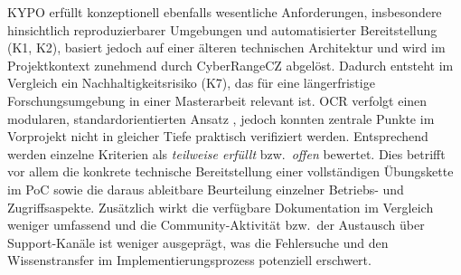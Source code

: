 KYPO erfüllt konzeptionell ebenfalls wesentliche Anforderungen, insbesondere hinsichtlich reproduzierbarer Umgebungen und automatisierter Bereitstellung (K1, K2), basiert jedoch auf einer älteren technischen Architektur und wird im Projektkontext zunehmend durch CyberRangeCZ abgelöst. Dadurch entsteht im Vergleich ein Nachhaltigkeitsrisiko (K7), das für eine längerfristige Forschungsumgebung in einer Masterarbeit relevant ist. OCR verfolgt einen modularen, standardorientierten Ansatz , jedoch konnten zentrale Punkte im Vorprojekt nicht in gleicher Tiefe praktisch verifiziert werden. Entsprechend werden einzelne Kriterien als \emph{teilweise erfüllt} bzw.\ \emph{offen} bewertet. Dies betrifft vor allem die konkrete technische Bereitstellung einer vollständigen Übungskette im PoC sowie die daraus ableitbare Beurteilung einzelner Betriebs- und Zugriffsaspekte. Zusätzlich wirkt die verfügbare Dokumentation im Vergleich weniger umfassend und die Community-Aktivität bzw.\ der Austausch über Support-Kanäle ist weniger ausgeprägt, was die Fehlersuche und den Wissenstransfer im Implementierungsprozess potenziell erschwert.
